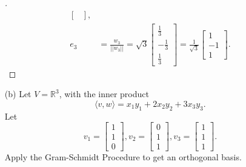 \documentclass[11pt]{article}
\begin{document}
\begin{enumerate}
\begin{proof}[\unskip\nopunct]
\begin{align*}
\begin{bmatrix}
                \end{bmatrix}, \\
                e_3 &= \frac{w_3}{||w_3||} = \sqrt{3} \begin{bmatrix}
                    \frac{1}{3} \\ - \frac{1}{3} \\ \frac{1}{3}
                \end{bmatrix} = \frac{1}{\sqrt{3}} \begin{bmatrix}
                    1 \\ -1 \\ 1
                \end{bmatrix}.
            \end{align*}
        \end{proof}

        \item[(b)] Let \(V = \mathbb{R}^3\), with the inner product \[ \langle v,w \rangle = x_1 y_1 + 2x_2 y_2 + 3 x_3 y_3.\] Let \[v_1 = \begin{bmatrix}
            1 \\ 1 \\ 0
        \end{bmatrix}, v_2 = \begin{bmatrix}
            0 \\ 1 \\ 1
        \end{bmatrix}, v_3 = \begin{bmatrix}
            1 \\ 1 \\ 1
        \end{bmatrix}.\] Apply the Gram-Schmidt Procedure to get an orthogonal basis.
        

\end{enumerate}
\end{document}
